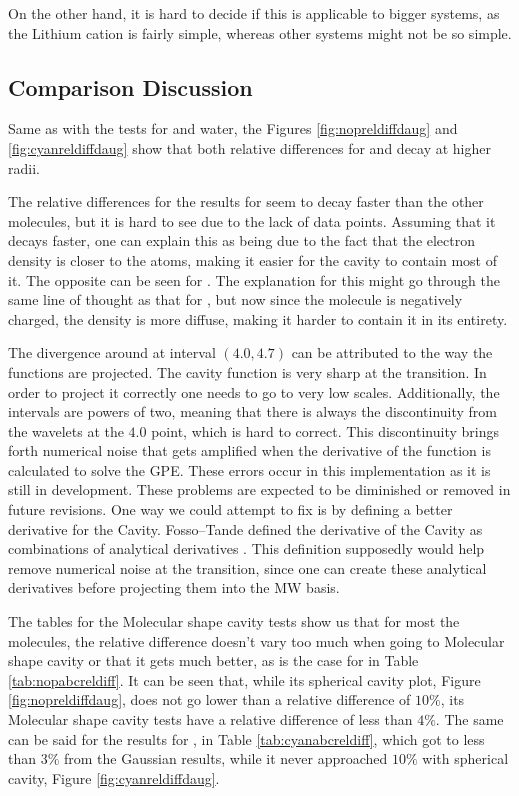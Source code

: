 \documentclass[../master_thesis.tex]{subfiles}
\begin{document}
On the other hand, it is hard to decide if this is applicable to bigger systems,
as the Lithium cation is fairly simple, whereas
other systems might not be so simple.

\subsection{Comparison Discussion}
Same as with the tests for  and water, the Figures \ref{fig:nopreldiffdaug}
and  \ref{fig:cyanreldiffdaug} show that both relative differences for 
and  decay at higher radii.

The relative differences for the results for   seem to decay faster
than the other molecules, but it
is hard to see due to the lack of data points. Assuming that it decays faster,
one can explain this as being due to the fact that the electron density is
closer to the atoms, making it easier for the cavity to contain most of it.
The opposite can be seen for . The explanation for this might go through
the same line of thought as that for , but now since the molecule is negatively
charged, the density is more diffuse, making it harder to contain it in its entirety.

The divergence around at interval $(4.0, 4.7)$ can be attributed to the way the
functions are projected. The cavity function is very sharp at the transition. In order to
project it correctly one needs to go to very low scales.
Additionally, the intervals are
powers of two, meaning that there is always the discontinuity from the wavelets at the
$4.0$ point, which is hard to correct. This discontinuity brings forth numerical
noise that gets amplified when the derivative of the function is calculated to solve the
\ac{GPE}.
These errors occur in this implementation as it is still in development. These
problems are expected to be diminished or removed in future revisions. One way we
could attempt to fix is by defining a better derivative for the Cavity.
Fosso--Tande defined the derivative of the Cavity as combinations of analytical
derivatives \cite{FossoTande:2013ka}. This definition supposedly would help
remove numerical noise at the transition, since one can create these analytical
derivatives before projecting them into the \ac{MW} basis.

The tables for the Molecular shape cavity tests  show us that for most the molecules, the
relative difference doesn't vary too much when going to Molecular shape cavity or that it gets
much better, as is the case for  in Table \ref{tab:nopabcreldiff}.
It can be seen that, while its spherical cavity plot, Figure \ref{fig:nopreldiffdaug}, does not go
lower than a relative difference of $10\%$, its Molecular shape cavity tests have a relative difference
of less than $4\%$. The same can be said for the results for , in Table \ref{tab:cyanabcreldiff},
which got to less than $3\%$ from the Gaussian results, while it never approached $10\%$
with spherical cavity, Figure \ref{fig:cyanreldiffdaug}.
\end{document}

